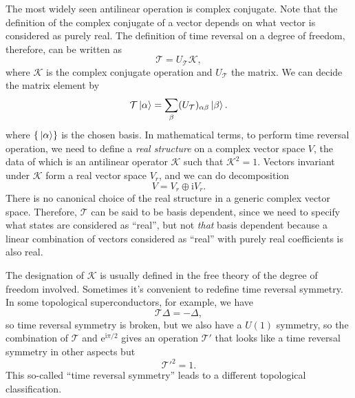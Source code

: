 \documentclass[hyperref, a4paper]{article}
\newcommand*{\ii}{\mathrm{i}}
\newcommand*{\ee}{\mathrm{e}}
\begin{document}
The most widely seen antilinear operation is complex conjugate. Note that the definition of the complex 
conjugate of a vector depends on what vector is considered as purely real. 
The definition of time reversal on a degree of freedom, therefore, can be written as
\begin{equation}
    \mathcal{T} = U_{\mathcal{T}} \mathcal{K},
\end{equation}
where $\mathcal{K}$ is the complex conjugate operation and $U_\mathcal{T}$ the matrix. We can decide the 
matrix element by 
\begin{equation}
    \mathcal{T} \ket*{\alpha} = \sum_\beta (U_\mathcal{T})_{\alpha \beta }\ket*{\beta}.
\end{equation}
where $\{\ket*{\alpha}\}$ is the chosen basis. 
In mathematical terms, to perform time reversal operation, we need to define a \emph{real structure} on a 
complex vector space $V$, the data of which is an antilinear operator $\mathcal{K}$ such that $\mathcal{K}^2 = 1$.
Vectors invariant under $\mathcal{K}$ form a real vector space $V_r$, and we can do decomposition 
\begin{equation}
    V = V_r \oplus \ii V_r.
\end{equation}
There is no canonical choice of the real structure in a generic complex vector space.
Therefore, $\mathcal{T}$ can be said to be basis dependent, since we need to specify what states are 
considered as ``real'', but not \emph{that} basis dependent because a linear combination of 
vectors considered as ``real'' with purely real coefficients is also real.

The designation of $\mathcal{K}$ is usually defined in the free theory of the degree of freedom involved.
Sometimes it's convenient to redefine time reversal symmetry. In some topological superconductors, for example, 
we have 
\begin{equation}
    \mathcal{T} \Delta = - \Delta, 
\end{equation}
so time reversal symmetry is broken, but we also have a $U(1)$ symmetry, so the combination of $\mathcal{T}$
and $\ee^{\ii \pi / 2}$ gives an operation $\mathcal{T}'$ that looks like a time reversal symmetry in 
other aspects but 
\begin{equation}
    \mathcal{T}'^2 = 1.
\end{equation}
This so-called ``time reversal symmetry'' leads to a different topological classification.
\end{document}

